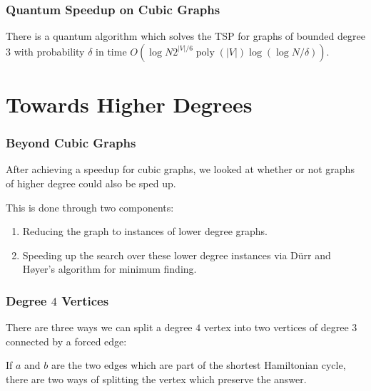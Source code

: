 \documentclass[]{beamer}
\DeclareMathOperator{\poly}{poly}
\begin{document}
\begin{frame}
\frametitle{Quantum Speedup on Cubic Graphs}
\begin{theorem}
There is a quantum algorithm which solves the TSP for graphs of bounded degree $3$ with probability $\delta$ in time $O(\log N2^{|V|/6}\poly(|V|)\log(\log N/\delta))$.
\end{theorem}
\end{frame}

\section{Towards Higher Degrees}

\begin{frame}
\frametitle{Beyond Cubic Graphs}
After achieving a speedup for cubic graphs, we looked at whether or not graphs of higher degree could also be sped up.

This is done through two components:
\begin{enumerate}
\item Reducing the graph to instances of lower degree graphs.
\item Speeding up the search over these lower degree instances via D\"urr and H\o yer's algorithm for minimum finding.
\end{enumerate}
\end{frame}

\begin{frame}
\frametitle{Degree $4$ Vertices}

There are three ways we can split a degree $4$ vertex into two vertices of degree $3$ connected by a forced edge:

\begin{center}
\end{center}

If $a$ and $b$ are the two edges which are part of the shortest Hamiltonian cycle, there are two ways of splitting the vertex which preserve the answer.
\end{frame}
\end{document}
